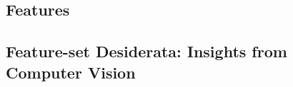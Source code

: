 \subsection{Features}\label{sec:expvars:features}
\label{sec:features}


%
%




\subsection{Feature-set Desiderata: Insights from Computer Vision}



